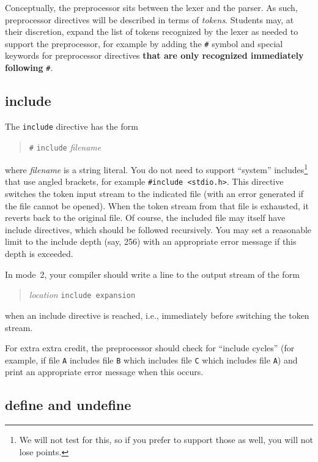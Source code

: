 \documentclass{article}
\begin{document}
Conceptually,
the preprocessor sits between the lexer and the parser.
As such, preprocessor directives will be described in terms
of \emph{tokens}.
Students may, at their discretion,
expand the list of tokens recognized by the lexer as needed to
support the preprocessor,
for example by adding the \verb|#| symbol
and special keywords for preprocessor directives
{\bf that are only recognized immediately following} \verb|#|.


\subsection{include}

The \verb|include| directive has the form
\begin{quote}
  \verb|#| \verb|include| \emph{filename}
\end{quote}
where \emph{filename} is a string literal.
You do not need to support ``system'' includes\footnote{We
  will not test for this, so if you prefer to
  support those as well, you will not lose points.}
that use angled brackets, for example \verb|#include <stdio.h>|.
This directive switches the token input stream to the
indicated file
(with an error generated if the file cannot be opened).
When the token stream from that file is exhausted,
it reverts back to the original file.
Of course, the included file may itself have include directives,
which should be followed recursively.
You may set a reasonable limit to the include depth (say, 256)
with an appropriate error message if this depth is exceeded.

In mode~2, your compiler should write a line to the output stream
of the form
\begin{quote}
  \emph{location} \verb|include expansion|
\end{quote}
when an include directive is reached,
i.e., immediately before switching the token stream.

For extra extra credit,
the preprocessor should check for ``include cycles''
(for example, if file {\tt A} includes file {\tt B} which includes file {\tt C}
which includes file {\tt A})
and print an appropriate error message when this occurs.

\subsection{define and undefine}
\end{document}

